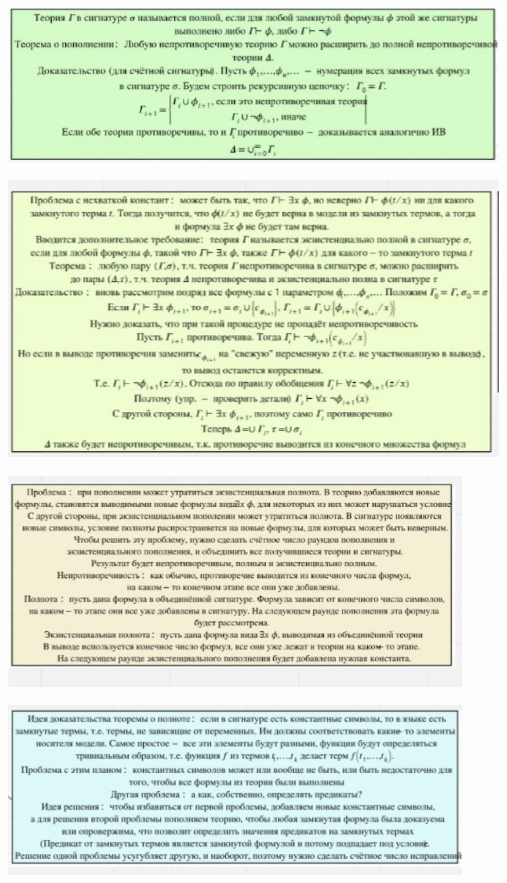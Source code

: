 \begin{center}
    \includegraphics[width=13cm]{images/1.5_m1}

    \includegraphics[width=13cm]{images/1.5_m2}

    \includegraphics[width=12cm]{images/1.5_m3}

    \includegraphics[width=12cm]{images/1.5_full}
\end{center}

